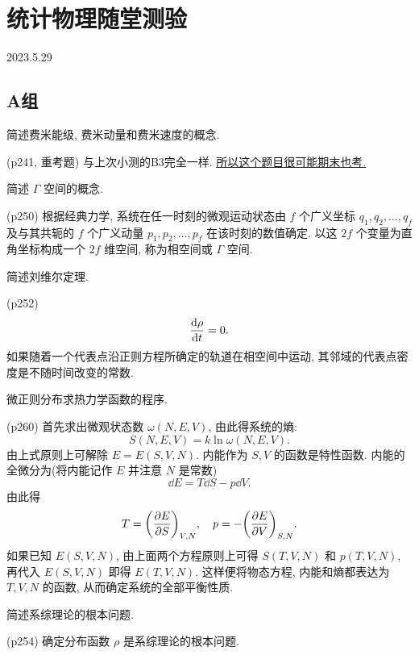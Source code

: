 \section{统计物理随堂测验}
2023.5.29
\subsection{A组}
\begin{questions}
  \qt 简述费米能级, 费米动量和费米速度的概念.
  \begin{solution}
(p241, 重考题) 与上次小测的B3完全一样. \uline{所以这个题目很可能期末也考.}
  \end{solution}
  \qt 简述 $\Gamma$ 空间的概念.
  \begin{solution}
    (p250) 根据经典力学, 系统在任一时刻的微观运动状态由 $f$ 个广义坐标 $q_1, q_2, \dots, q_f$ 及与其共轭的 $f$ 个广义动量 $p_1, p_2, \dots, p_f$ 在该时刻的数值确定. 以这 $2f$ 个变量为直角坐标构成一个 $2f$ 维空间, 称为相空间或 $\Gamma$ 空间.
  \end{solution}
  \qt 简述刘维尔定理.
  \begin{solution}
    (p252)
    \begin{equation}
      \dv{\rho}{t} = 0.
    \end{equation}
    如果随着一个代表点沿正则方程所确定的轨道在相空间中运动, 其邻域的代表点密度是不随时间改变的常数.
  \end{solution}
  \qt 微正则分布求热力学函数的程序.
  \begin{solution}
    (p260) 首先求出微观状态数 $\omega(N, E, V)$, 由此得系统的熵:
    \begin{equation}
      S(N, E, V) = k \ln \omega(N, E, V).
    \end{equation}
    由上式原则上可解除 $E = E(S, V, N)$. 内能作为 $S, V$ 的函数是特性函数. 内能的全微分为(将内能记作 $E$ 并注意 $N$ 是常数)
    \begin{equation}
      \dd E = T\dd S - p\dd V.
    \end{equation}
    由此得
    \begin{equation}
      T = \qty(\pdv{E}{S})_{V,N} \qc p = -\qty(\pdv{E}{V})_{S,N}.
    \end{equation}
    如果已知 $E(S,V,N)$, 由上面两个方程原则上可得 $S(T, V, N)$ 和 $p(T, V, N)$, 再代入 $E(S,V,N)$ 即得 $E(T, V, N)$. 这样便将物态方程, 内能和熵都表达为 $T, V, N$ 的函数, 从而确定系统的全部平衡性质.
  \end{solution}
  \qt 简述系综理论的根本问题.
  \begin{solution}
    (p254) 确定分布函数 $\rho$ 是系综理论的根本问题.
  \end{solution}
\end{questions}
